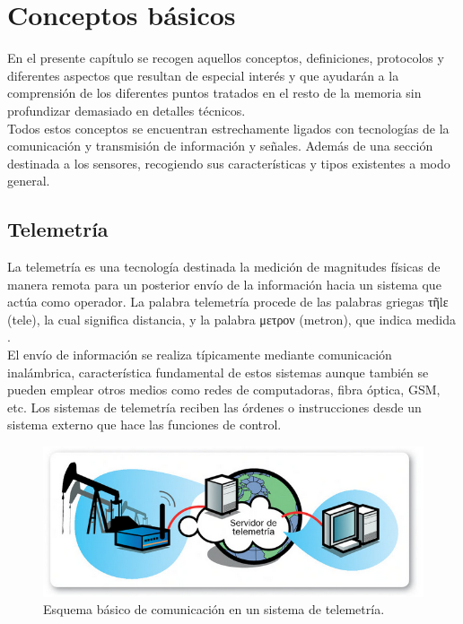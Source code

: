 
\newpage

\chapter{Conceptos básicos}
\label{chap:conceptos-básicos}


En el presente capítulo se recogen aquellos conceptos, definiciones, protocolos y diferentes aspectos que resultan de especial interés y que ayudarán a la comprensión de los diferentes puntos tratados en el resto de 
la memoria sin profundizar demasiado en detalles técnicos.\\

Todos estos conceptos se encuentran estrechamente ligados con tecnologías de la comunicación y transmisión de información y señales. Además de una sección destinada a los sensores, recogiendo sus 
características y tipos existentes a modo general.\\


\section{Telemetría}
\label{def:telemetria}

La telemetría es una tecnología destinada la medición de magnitudes físicas de manera remota para un posterior envío de la información hacia un sistema que actúa como operador. La palabra telemetría
procede de las palabras griegas τῆlε (tele), la cual significa distancia, y la palabra μετρον (metron), que indica medida \cite{book:telemetria}.\\

El envío de información se realiza típicamente mediante comunicación inalámbrica, característica fundamental de estos sistemas aunque también se pueden emplear otros medios 
como redes de computadoras, fibra óptica, GSM, etc. Los sistemas de telemetría reciben las órdenes o instrucciones desde un sistema externo que hace las 
funciones de control.\\


\begin{figure}[H]
  \begin{center}
    \includegraphics[scale=0.4]{imagenes/telemetria.png}
  \end{center}
  \label{fig:telemetria}
 \caption{Esquema básico de comunicación en un sistema de telemetría.}
\end{figure}



